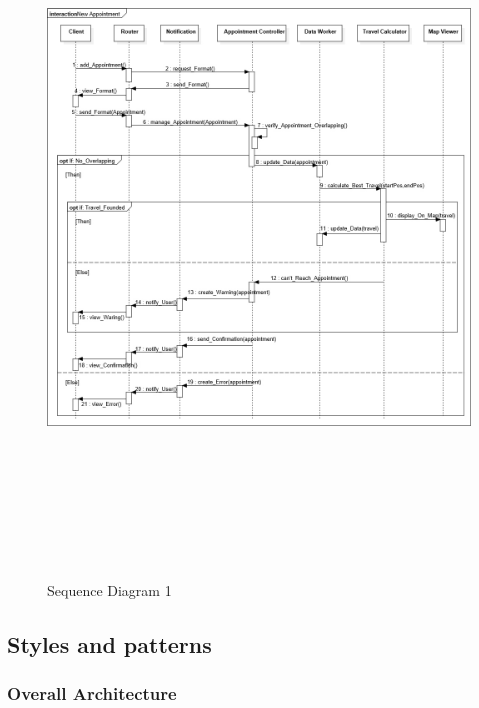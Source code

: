 \documentclass [12pt]{article}
\begin{document}
\begin{figure}[ht!]
\centering
\includegraphics[height=19cm, width=\linewidth]{SQ1.jpg}
\caption{Sequence Diagram 1}
\end{figure}  
\clearpage



\subsection{Styles and patterns}
\subsubsection{Overall Architecture}
\end{document}

